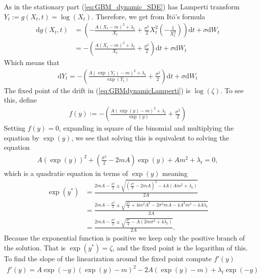 As in the stationary part (\ref{eq:GBM_dynamic_SDE}) has Lamperti transform $Y_t:= g(X_t, t) = \log(X_t)$. Therefore, we get from Itō's formula
\begin{align}
    \mathrm{d}g(X_t, t) &= \left(-\frac{A\left(X_t-m\right)^2 + \lambda_t}{X_t} + \frac{\sigma^2}{2}X_t^2\left(-\frac{1}{X_t^{2}}\right)\right)\mathrm{d}t + \sigma \mathrm{d}W_t \nonumber \\
    &= -\left(\frac{A\left(X_t-m\right)^2 + \lambda_t}{X_t} + \frac{\sigma^2}{2}\right)\mathrm{d}t + \sigma \mathrm{d}W_t
\end{align}
Which means that
\begin{align}
    \mathrm{d}Y_t = - \left(\frac{A\left(\exp\left(Y_t\right)-m\right)^2 + \lambda_t}{\exp(Y_t)} + \frac{\sigma^2}{2}\right)\mathrm{d}t + \sigma \mathrm{d}W_t \label{eq:GBMdynamicLamperti}
\end{align}
The fixed point of the drift in (\ref{eq:GBMdynamicLamperti}) is $\log\left(\zeta\right)$. To see this, define
\begin{align}
    f(y) := -\left(\frac{A\left(\exp\left(y\right)-m\right)^2 + \lambda_t}{\exp(y)} + \frac{\sigma^2}{2}\right)
\end{align}
Setting $f(y) = 0$, expanding in square of the binomial and multiplying the equation by $\exp(y)$, we see that solving this is equivalent to solving the equation
\begin{align}
    A\left(\exp\left(y\right)\right)^2 + \left(\frac{\sigma^2}{2} - 2mA\right)\exp\left(y\right) + Am^2 + \lambda_t = 0,
\end{align}
which is a quadratic equation in terms of $\exp(y)$ meaning
\begin{align}
    \exp(y^*) &= \frac{2mA - \frac{\sigma^2}{2}\pm\sqrt{\left(\frac{\sigma^2}{2} - 2mA\right)^2 - 4A\left(Am^2 + \lambda_t\right)}}{2A}\nonumber \\
    &= \frac{2mA - \frac{\sigma^2}{2}\pm\sqrt{\frac{\sigma^4}{4} + 4m^2A^2 - 2\sigma^2mA-4A^2m^2-4A\lambda_t}}{2A}\nonumber \\
    &= \frac{2mA - \frac{\sigma^2}{2}\pm\sqrt{\frac{\sigma^4}{4}-A\left(2m\sigma^2 + 4\lambda_t\right)}}{2A}.
\end{align}
Because the exponential function is positive we keep only the positive branch of the solution. That is $\exp\left(y^*\right) = \zeta$, and the fixed point is the logarithm of this. To find the slope of the linearization around the fixed point compute $f'(y)$
\begin{align}
    f'(y) = A\exp(-y)\left(\exp(y) - m\right)^2 - 2A\left(\exp(y) - m\right) + \lambda_t\exp(-y)
\end{align}
